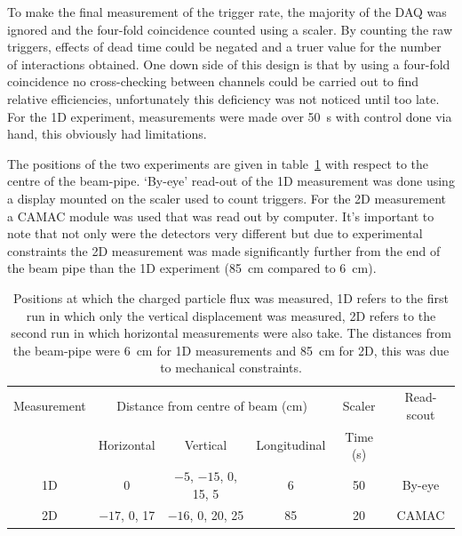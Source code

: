 To make the final measurement of the trigger rate, the majority of the DAQ was ignored and the four-fold coincidence counted using a scaler. By counting the raw triggers, effects of dead time could be negated and a truer value for the number of interactions obtained. One down side of this design is that by using a four-fold coincidence no cross-checking between channels could be carried out to find relative efficiencies, unfortunately this deficiency was not noticed until too late. For the 1D experiment, measurements were made over 50~s with control done via hand, this obviously had limitations.

The positions of the two experiments are given in table~\ref{tab:flux_setup} with respect to the centre of the beam-pipe. `By-eye' read-out of the 1D measurement was done using a display mounted on the scaler used to count triggers. For the 2D measurement a CAMAC module was used that was read out by computer. It's important to note that not only were the detectors very different but due to experimental constraints the 2D measurement was made significantly further from the end of the beam pipe than the 1D experiment (85~cm compared to 6~cm).
\begin{table}
  \begin{center}
    \begin{tabular}{c|c|c|c|c|c}
      Measurement  &  \multicolumn{3}{c|}{Distance from centre of beam (cm)}         &  Scaler    &  Read-scout \\
      &    Horizontal    &       Vertical              &  Longitudinal  &  Time (s)  &          \\
      \hline            
      1D           &  0               &  \(-5\), \(-15\), 0, 15, 5  &       6        &  50        & By-eye   \\
      2D           &  \(-17\), 0, 17  &  \(-16\), 0, 20, 25         &       85       &  20        & CAMAC    \\
    \end{tabular}
  \end{center}
  \caption{Positions at which the charged particle flux was measured, 1D refers to the first run in which only the vertical displacement was measured, 2D refers to the second run in which horizontal measurements were also take. The distances from the beam-pipe were 6~cm for 1D measurements and 85~cm for 2D, this was due to mechanical constraints.}
  \label{tab:flux_setup}
\end{table}

